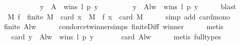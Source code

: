 \begin{isabellebody}
\ \ \isamarkupfalse%
\ {}\ {}\ \isamarkupfalse%
\ {}{\isacharcolon}{\kern0pt}\isanewline
\ \ \ \ {\isachardoublequoteopen}{\isacharbraceleft}{\kern0pt}y\ {\isasymin}\ A\ {\isachardot}{\kern0pt}\ wins\ l\ p\ y{\isacharbraceright}{\kern0pt}\ {\isacharequal}{\kern0pt}\isanewline
\ \ \ \ \ \ \ \ {\isacharbraceleft}{\kern0pt}y\ {\isasymin}\ A{\isacharminus}{\kern0pt}{\isacharbraceleft}{\kern0pt}l{\isacharcomma}{\kern0pt}w{\isacharbraceright}{\kern0pt}\ {\isachardot}{\kern0pt}\ wins\ l\ p\ y{\isacharbraceright}{\kern0pt}{\isachardoublequoteclose}\isanewline
\ \ \ \ \isamarkupfalse%
\ blast\isanewline
\ \ \isamarkupfalse%
\ {}{\isacharcolon}{\kern0pt}\ {\isachardoublequoteopen}{\isasymforall}\ M\ f\ {\isachardot}{\kern0pt}\ finite\ M\ {\isasymlongrightarrow}\ card\ {\isacharbraceleft}{\kern0pt}x\ {\isasymin}\ M\ {\isachardot}{\kern0pt}\ f\ x{\isacharbraceright}{\kern0pt}\ {\isasymle}\ card\ M{\isachardoublequoteclose}\isanewline
\ \ \ \ \isamarkupfalse%
\ {\isacharparenleft}{\kern0pt}simp\ add{\isacharcolon}{\kern0pt}\ card{\isacharunderscore}{\kern0pt}mono{\isacharparenright}{\kern0pt}\isanewline
\ \ \isamarkupfalse%
\ {}{\isacharcolon}{\kern0pt}\ {\isachardoublequoteopen}finite\ {\isacharparenleft}{\kern0pt}A{\isacharminus}{\kern0pt}{\isacharbraceleft}{\kern0pt}l{\isacharcomma}{\kern0pt}w{\isacharbraceright}{\kern0pt}{\isacharparenright}{\kern0pt}{\isachardoublequoteclose}\isanewline
\ \ \ \ \isamarkupfalse%
\ condorcet{\isacharunderscore}{\kern0pt}winner{\isachardot}{\kern0pt}simps\ finite{\isacharunderscore}{\kern0pt}Diff\ winner\isanewline
\ \ \ \ \isamarkupfalse%
\ metis\isanewline
\ \ \isamarkupfalse%
\ {}\ {}\ \isamarkupfalse%
\ {}{\isacharcolon}{\kern0pt}\isanewline
\ \ \ \ {\isachardoublequoteopen}card\ {\isacharbraceleft}{\kern0pt}y\ {\isasymin}\ A{\isacharminus}{\kern0pt}{\isacharbraceleft}{\kern0pt}l{\isacharcomma}{\kern0pt}w{\isacharbraceright}{\kern0pt}\ {\isachardot}{\kern0pt}\ wins\ l\ p\ y{\isacharbraceright}{\kern0pt}\ {\isasymle}\isanewline
\ \ \ \ \ \ card\ {\isacharparenleft}{\kern0pt}A{\isacharminus}{\kern0pt}{\isacharbraceleft}{\kern0pt}l{\isacharcomma}{\kern0pt}w{\isacharbraceright}{\kern0pt}{\isacharparenright}{\kern0pt}{\isachardoublequoteclose}\isanewline
\ \ \ \ \isamarkupfalse%
\ {\isacharparenleft}{\kern0pt}metis\ {\isacharparenleft}{\kern0pt}full{\isacharunderscore}{\kern0pt}types{\isacharparenright}{\kern0pt}{\isacharparenright}{\kern0pt}\isanewline

\end{isabellebody}
